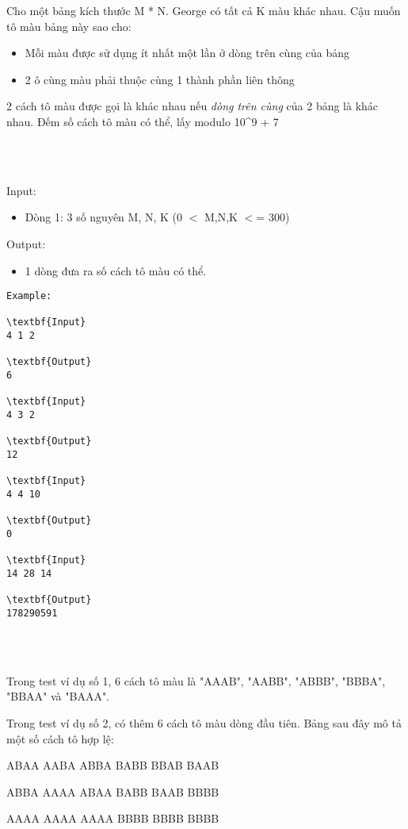 

Cho một bảng kích thước M * N. George có tất cả K màu khác nhau. Cậu muốn tô màu bảng này sao cho:
\begin{itemize}
	\item 

Mỗi màu được sử dụng ít nhất một lần ở dòng trên cùng của bảng
	\item 

2 ô cùng màu phải thuộc cùng 1 thành phần liên thông
\end{itemize}

2 cách tô màu được gọi là khác nhau nếu \emph{ dòng trên cùng } của 2 bảng là khác nhau. Đếm số cách tô màu có thể, lấy modulo 10\textasciicircum9 + 7


\\ 

Input:
\begin{itemize}
	\item 

Dòng 1: 3 số nguyên M, N, K (0 $<$ M,N,K $<$= 300)
\end{itemize}

Output:
\begin{itemize}
	\item 

1 dòng đưa ra số cách tô màu có thể.
\end{itemize}
\begin{verbatim}
Example:

\textbf{Input}
4 1 2

\textbf{Output}
6

\textbf{Input}
4 3 2

\textbf{Output}
12

\textbf{Input}
4 4 10

\textbf{Output}
0

\textbf{Input}
14 28 14

\textbf{Output}
178290591\end{verbatim}


\\ 

Trong test ví dụ số 1, 6 cách tô màu là "AAAB", "AABB", "ABBB", "BBBA", "BBAA" và "BAAA".

Trong test ví dụ số 2, có thêm 6 cách tô màu dòng đầu tiên. Bảng sau đây mô tả một số cách tô hợp lệ:

ABAA AABA ABBA BABB BBAB BAAB

ABBA AAAA ABAA BABB BAAB BBBB

AAAA AAAA AAAA BBBB BBBB BBBB


\\ 